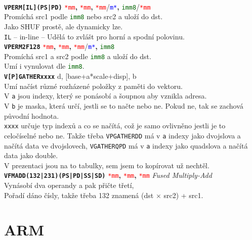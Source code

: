 \documentclass[
]{cz_sablona}
\newcommand{\reg}[1]{\texttt{\textcolor{red}{#1}}}
\newcommand{\mem}[1]{\texttt{\textcolor{blue}{#1}}}
\newcommand{\const}[1]{\texttt{\textcolor{darkgreen}{#1}}}
\newcommand{\instr}[1]{\texttt{\textbf{#1}}}
\begin{document}
\\[0.5em]
\instr{VPERM[IL](PS|PD)} \reg{*mm}\textbf{,} \reg{*mm}\textbf{,} \reg{*mm}/\mem{m*}\textbf{,} \const{imm8}/\reg{*mm}\\
Promíchá src1 podle \const{imm8} nebo src2 a uloží do dst.\\
Jako SHUF prostě, ale dynamicky lze.\\
\texttt{IL} -- in-line -- Udělá to zvlášt pro horní a spodní polovinu.\\
\instr{VPERM2F128} \reg{*mm}\textbf{,} \reg{*mm}\textbf{,} \reg{*mm}/\mem{m*}\textbf{,} \const{imm8}\\
Promíchá src1 a src2 podle \const{imm8} a uloží do dst.\\
Umí i vynulovat dle \const{imm8}.
\\[0.5em]
\instr{V[P]GATHERxxxx} d, [base+a*scale+disp], b\\
Umí načíst různé rozházené položky z paměti do vektoru.\\
V \texttt{a} jsou indexy, který se ponásobí a šoupnou aby vznikla adresa.\\
V \texttt{b} je maska, která určí, jestli se to načte nebo ne.
Pokud ne, tak se zachová původní hodnota.\\
\texttt{xxxx} určuje typ indexů a co se načítá, což je samo ovlivněno jestli
je to celočíselné nebo ne.
Takže třeba \texttt{VPGATHERDD} má v \texttt{a} indexy jako dvojslova
a načítá data ve dvojslovech,
\texttt{VGATHERQPD} má v \texttt{a} indexy jako quadslova
a načítá data jako double.\\
V prezentaci jsou na to tabulky, sem jsem to kopírovat už nechtěl.
\\[0.5em]
\instr{VFMADD(132|231)(PS|PD|SS|SD)} \reg{*mm}\textbf{,} \reg{*mm}\textbf{,} \reg{*mm}
\textit{Fused Multiply-Add}\\
Vynásobí dva operandy a pak přičte třetí,\\
Pořadí dáno čísly, takže třeba 132 znamená (dst $\times$ src2) + src1.\\

\section{ARM}
\end{document}
